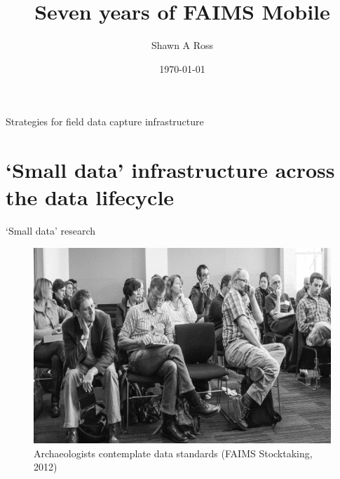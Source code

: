 \documentclass[aspectratio=169, 12pt]{beamer} %
\title{Seven years of FAIMS Mobile} %
\author{Shawn A Ross}               %
\institute{Office of the Deputy Vice-Chancellor (Research)}         %
\date{\today}                 %
\begin{document}

\maketitle

  

\begin{frame}{Strategies for field data capture infrastructure}
  \tableofcontents
\end{frame}

%



\section{`Small data' infrastructure across the data lifecycle}

\begin{frame}{`Small data' research}
 \begin{figure}[H]
    \centering
        \includegraphics[height=.75\textheight]{figures/Archaeologists-standards.png}
        \caption{Archaeologists contemplate data standards (FAIMS Stocktaking, 2012)}
        \label{fig:figure7}
 \end{figure}
\end{frame}
\end{document}
